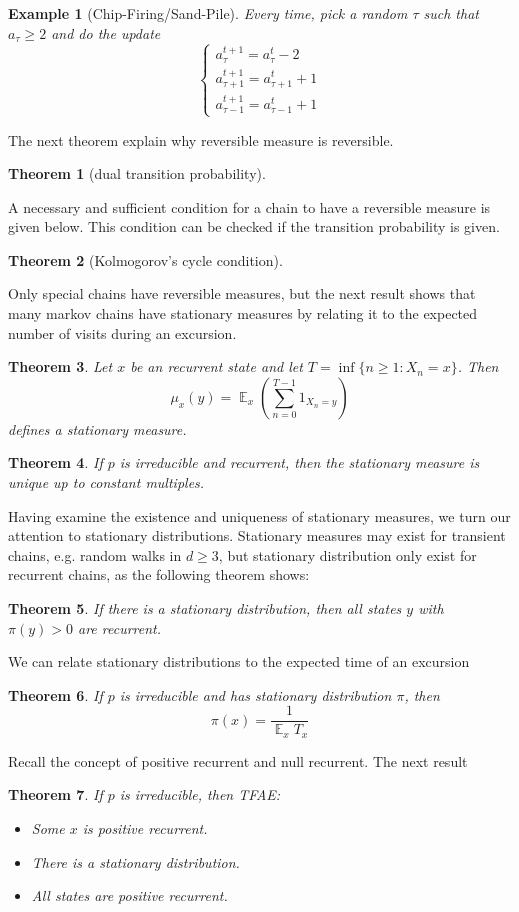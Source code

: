 \documentclass{article}
\newtheorem{Thm}{Theorem}[section]
\newtheorem{Eg}{Example}[section]
\theoremstyle{definition}
\newcommand{\EE}{\operatorname{\mathbb{E}}}
\renewcommand{\geq}{\geqslant}
\newcommand{\<}{\left\langle}
\renewcommand{\>}{\right\rangle}
\begin{document}
\begin{Eg}[Chip-Firing/Sand-Pile]
    Every time, pick a random $\tau$ such that $a_\tau\geq 2$ and do the update 
    \[\left\{\begin{matrix}
        a_\tau^{t+1} = a_\tau^{t} -2 \\
        a_{\tau+1}^{t+1}= a_{\tau+1}^{t}+1  \\
        a_{\tau-1}^{t+1}= a_{\tau-1}^{t}+1
        \end{matrix}\right.\]
\end{Eg}

The next theorem explain why reversible measure is reversible.
\begin{Thm}[dual transition probability]
    
\end{Thm}

A necessary and sufficient condition for a chain to have a reversible measure is given below. This condition can be checked if the transition probability is given.
\begin{Thm}[Kolmogorov's cycle condition]
    
\end{Thm}
Only special chains have reversible measures, but the next result shows that many markov chains have stationary measures by relating it to the expected number of visits during an excursion.
\begin{Thm}\label{stationary measure and expected number of visit}
    Let $x$ be an recurrent state and let $T=\inf\{n\geq 1:X_n=x\}$. Then 
    \[\mu_x(y)=\EE_x(\sum_{n=0}^{T-1}1_{X_n=y}) \] 
    defines a stationary measure.
\end{Thm}

\begin{Thm}
   If $p$ is irreducible and recurrent, then the stationary measure is unique up to constant multiples. 
\end{Thm}
Having examine the existence and uniqueness of stationary measures, we turn our attention to stationary distributions.
Stationary measures may exist for transient chains, e.g. random walks in $d\geq 3$, but stationary distribution only exist for recurrent chains,
as the following theorem shows:
\begin{Thm}
    If there is a stationary distribution, then all states $y$ with $\pi(y)>0$ are recurrent.
\end{Thm}
We can relate stationary distributions to the expected time of an excursion
\begin{Thm}
    If $p$ is irreducible and has stationary distribution $\pi$, then 
    \[\pi(x)=\frac{1}{\EE_x T_x}\]
\end{Thm}
Recall the concept of positive recurrent and null recurrent. The next result 
\begin{Thm}
    If $p$ is irreducible, then TFAE:
    \begin{itemize}
        \item Some $x$ is positive recurrent.
        \item There is a stationary distribution.
        \item All states are positive recurrent.
    \end{itemize}
\end{Thm}
\end{document}
